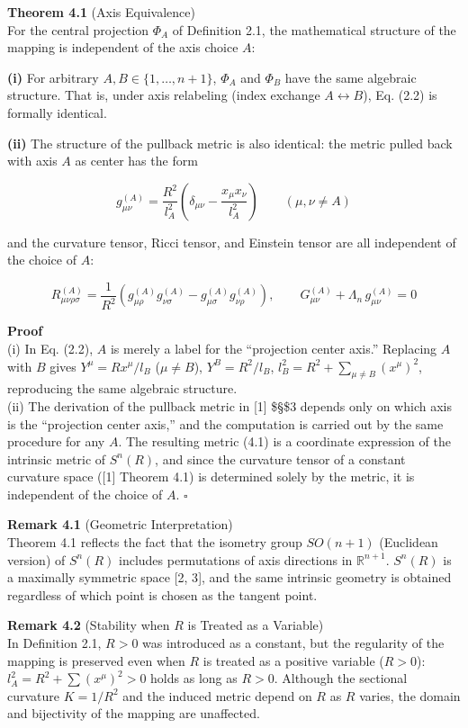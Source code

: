 \documentclass[a4paper,11pt]{article}
\theoremstyle{definition}
\begin{document}
\textbf{Theorem 4.1} (Axis Equivalence)\\
For the central projection \(\Phi_A\) of Definition 2.1, the mathematical structure of the mapping is independent of the axis choice \(A\):

\textbf{(i)} For arbitrary \(A, B \in \{1, \ldots, n+1\}\), \(\Phi_A\) and \(\Phi_B\) have the same algebraic structure. That is, under axis relabeling (index exchange \(A \leftrightarrow B\)), Eq. (2.2) is formally identical.

\textbf{(ii)} The structure of the pullback metric is also identical: the metric pulled back with axis \(A\) as center has the form

\[g_{\mu\nu}^{(A)} = \frac{R^2}{l_A^2}\left(\delta_{\mu\nu} - \frac{x_\mu x_\nu}{l_A^2}\right) \qquad (\mu, \nu \neq A) \tag{4.1}\]

and the curvature tensor, Ricci tensor, and Einstein tensor are all independent of the choice of \(A\):

\[R_{\mu\nu\rho\sigma}^{(A)} = \frac{1}{R^2}(g_{\mu\rho}^{(A)}g_{\nu\sigma}^{(A)} - g_{\mu\sigma}^{(A)}g_{\nu\rho}^{(A)}), \qquad G_{\mu\nu}^{(A)} + \Lambda_n\, g_{\mu\nu}^{(A)} = 0 \tag{4.2}\]

\textbf{Proof}\\
(i) In Eq. (2.2), \(A\) is merely a label for the ``projection center axis.'' Replacing \(A\) with \(B\) gives \(Y^\mu = Rx^\mu/l_B\) (\(\mu \neq B\)), \(Y^B = R^2/l_B\), \(l_B^2 = R^2 + \sum_{\mu \neq B}(x^\mu)^2\), reproducing the same algebraic structure.\\
(ii) The derivation of the pullback metric in {[}1{]} \$\S\$3 depends only on which axis is the ``projection center axis,'' and the computation is carried out by the same procedure for any \(A\). The resulting metric (4.1) is a coordinate expression of the intrinsic metric of \(S^n(R)\), and since the curvature tensor of a constant curvature space ({[}1{]} Theorem 4.1) is determined solely by the metric, it is independent of the choice of \(A\). \(\square\)

\textbf{Remark 4.1} (Geometric Interpretation)\\
Theorem 4.1 reflects the fact that the isometry group \(SO(n+1)\) (Euclidean version) of \(S^n(R)\) includes permutations of axis directions in \(\mathbb{R}^{n+1}\). \(S^n(R)\) is a maximally symmetric space {[}2, 3{]}, and the same intrinsic geometry is obtained regardless of which point is chosen as the tangent point.

\textbf{Remark 4.2} (Stability when \(R\) is Treated as a Variable)\\
In Definition 2.1, \(R > 0\) was introduced as a constant, but the regularity of the mapping is preserved even when \(R\) is treated as a positive variable (\(R > 0\)): \(l_A^2 = R^2 + \sum(x^\mu)^2 > 0\) holds as long as \(R > 0\). Although the sectional curvature \(K = 1/R^2\) and the induced metric depend on \(R\) as \(R\) varies, the domain and bijectivity of the mapping are unaffected.
\end{document}
